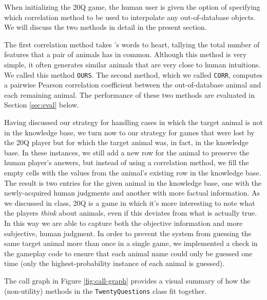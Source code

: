 \documentclass[11pt,a4paper]{article}
\begin{document}
When initializing the 20Q game, the human user is given the option of specifying which correlation method to be used to interpolate any out-of-database objects. We will discuss the two methods in detail in the present section.

The first correlation method takes \citeauthor{Rosch1978}'s \citeyearpar{Rosch1978} words to heart, tallying the total number of features that a pair of animals has in common. Although this method is very simple, it often generates similar animals that are very close to human intuitions. We called this method \texttt{OURS}. 
The second method, which we called \texttt{CORR}, computes a pairwise Pearson correlation coefficient between the out-of-database animal and each remaining animal. 
The performance of these two methods are evaluated in Section \ref{sec:eval} below.

Having discussed our strategy for handling cases in which the target animal is not in the knowledge base, we turn now to our strategy for games that were lost by the 20Q player but for which the target animal was, in fact, in the knowledge base. 
In these instances, we still add a new row for the animal to preserve the human player's answers, but instead of using a correlation method, we fill the empty cells with the values from the animal's existing row in the knowledge base. 
The result is two entries for the given animal in the knowledge base, one with the newly-acquired human judgments and another with more factual information. 
As we discussed in class, 20Q is a game in which it's more interesting to note what the players \textit{think} about animals, even if this deviates from what is actually true. 
In this way we are able to capture both the objective information and more subjective, human judgment. 
In order to prevent the system from guessing the same target animal more than once in a single game, we implemented a check in the gameplay code to ensure that each animal name could only be guessed one time (only the highest-probability instance of each animal is guessed).  

\vspace{\baselineskip}

\noindent The call graph in Figure \ref{fig:call-graph} provides a visual summary of how the (non-utility) methods in the \texttt{TwentyQuestions} class fit together.
\end{document}
